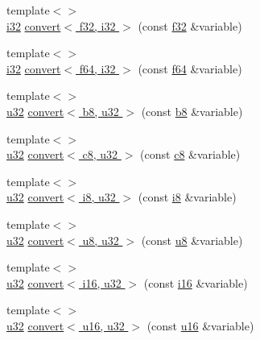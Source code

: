 \begin{DoxyCompactItemize}
\item 
{\footnotesize template$<$$>$ }\\\hyperlink{types_8h_a48d6cd8e4135fb2ff7e7f2dac84089ec}{i32} \hyperlink{namespacecrap_ae3cabf58d2da1cd720b9aafbc9d95fb3}{convert$<$ f32, i32 $>$} (const \hyperlink{types_8h_a154db6eda6a99565cb060a1da4b4c930}{f32} \&variable)
\item 
{\footnotesize template$<$$>$ }\\\hyperlink{types_8h_a48d6cd8e4135fb2ff7e7f2dac84089ec}{i32} \hyperlink{namespacecrap_a9987771a4b9e0d9c718ea09e9e69de87}{convert$<$ f64, i32 $>$} (const \hyperlink{types_8h_a76c9f53497f766e57b184bc8a93ab73f}{f64} \&variable)
\item 
{\footnotesize template$<$$>$ }\\\hyperlink{types_8h_afaa62991928fb9fb18ff0db62a040aba}{u32} \hyperlink{namespacecrap_a6b4e80dc88d7c7e591ecade27da97613}{convert$<$ b8, u32 $>$} (const \hyperlink{types_8h_a74eb47b4ab9e428eab7b91b3b877fa6c}{b8} \&variable)
\item 
{\footnotesize template$<$$>$ }\\\hyperlink{types_8h_afaa62991928fb9fb18ff0db62a040aba}{u32} \hyperlink{namespacecrap_af55b611bda39bc62e730ed7b9a76619d}{convert$<$ c8, u32 $>$} (const \hyperlink{types_8h_aa1ba8aac9fcd831012308297336ac74b}{c8} \&variable)
\item 
{\footnotesize template$<$$>$ }\\\hyperlink{types_8h_afaa62991928fb9fb18ff0db62a040aba}{u32} \hyperlink{namespacecrap_ad6193168bbf3bb5a961a73bff82877bd}{convert$<$ i8, u32 $>$} (const \hyperlink{types_8h_ae3702327b5f47e83b431e22b33da7b58}{i8} \&variable)
\item 
{\footnotesize template$<$$>$ }\\\hyperlink{types_8h_afaa62991928fb9fb18ff0db62a040aba}{u32} \hyperlink{namespacecrap_a369e23cad95a7bffbe7b1f18fe08893a}{convert$<$ u8, u32 $>$} (const \hyperlink{types_8h_a92c50087ca0e64fa93fc59402c55f8ca}{u8} \&variable)
\item 
{\footnotesize template$<$$>$ }\\\hyperlink{types_8h_afaa62991928fb9fb18ff0db62a040aba}{u32} \hyperlink{namespacecrap_a66d96cb492da4cb96260cf23edb8d096}{convert$<$ i16, u32 $>$} (const \hyperlink{types_8h_ad309dbcaeea13aa602d686964156ea0b}{i16} \&variable)
\item 
{\footnotesize template$<$$>$ }\\\hyperlink{types_8h_afaa62991928fb9fb18ff0db62a040aba}{u32} \hyperlink{namespacecrap_a48353f057b0b1df29946682faa0aeab9}{convert$<$ u16, u32 $>$} (const \hyperlink{types_8h_ace9d960e74685e2cd84b36132dbbf8aa}{u16} \&variable)

\end{DoxyCompactItemize}

